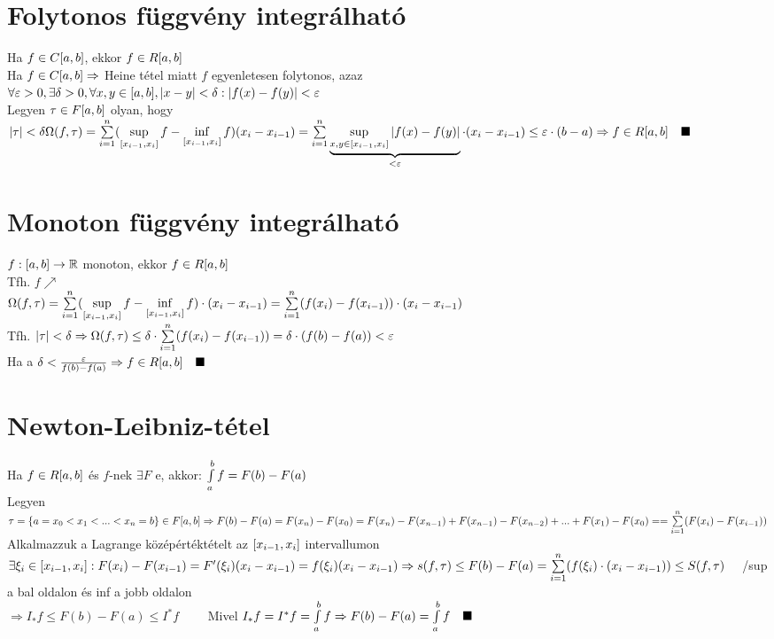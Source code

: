 \documentclass[a4paper,11pt]{article}
\begin{document}
\section{Folytonos függvény integrálható}
\tetel Ha $f\in C[a,b]$, ekkor $f\in R[a,b]$\\[0.2cm]
\biz Ha $f\in C[a,b]\Rightarrow$ Heine tétel miatt $f$ egyenletesen folytonos, azaz\\[0.2cm]
$\forall\varepsilon>0,\exists\delta>0,\forall x,y\in[a,b],\abs{x-y}<\delta:
\abs{f(x)-f(y)}<\varepsilon$\\[0.2cm]
Legyen $\tau\in F[a,b]$ olyan, hogy $\abs{\tau}<\delta\\[0.2cm]
\Omega(f,\tau)=\sum\limits_{i=1}^{n}(\sup\limits_{[x_{i-1},x_i]}f-\inf\limits_{[x_{i-1},x_i]}f)(x_i-x_{i-1})=\sum\limits_{i=1}^{n}
\underbrace{\sup\limits_{x,y\in[x_{i-1},x_i]}\abs{f(x)-f(y)}}_{<\varepsilon}\cdot(x_i-x_{i-1})
\leq\varepsilon\cdot(b-a)\\[0.2cm]\Rightarrow f\in R[a,b]\quad\blacksquare$
\section{Monoton függvény integrálható}
\tetel $f:[a,b]\to\mathbb{R}$ monoton, ekkor $f\in R[a,b]$\\[0.2cm]
\biz Tfh. $f\nearrow$\\[0.2cm]$\Omega(f,\tau)=\sum\limits_{i=1}^{n}
(\sup\limits_{[x_{i-1},x_i]}f-\inf\limits_{[x_{i-1},x_i]}f)\cdot(x_i-x_{i-1})=\sum\limits_{i=1}^{n}
(f(x_i)-f(x_{i-1}))\cdot(x_i-x_{i-1})$\\[0.2cm]Tfh. $\abs{\tau}<\delta\Rightarrow
\Omega(f,\tau)\leq\delta\cdot\sum\limits_{i=1}^{n}(f(x_i)-f(x_{i-1}))=\delta\cdot(f(b)-f(a))<\varepsilon$
\\[0.2cm]Ha a $\delta<\frac{\varepsilon}{f(b)-f(a)}\Rightarrow f\in R[a,b]\quad\blacksquare$
\newpage
\section{Newton-Leibniz-tétel}
\tetel Ha $f\in R[a,b]$ és $f$-nek $\exists F$ \prfv e, akkor: $\int\limits_{a}^{b} f=F(b)-F(a)$\\[0.1cm]
\biz Legyen $\tau=\{a=x_0<x_1<...<x_n=b\}\in F[a,b]\\[0.2cm]\Rightarrow F(b)-F(a)=
F(x_n)-F(x_0)=F(x_n)-F(x_{n-1})+F(x_{n-1})-F(x_{n-2})+...+F(x_1)-F(x_0)=\\[0.2cm]=
\sum\limits_{i=1}^{n}(F(x_i)-F(x_{i-1}))$ Alkalmazzuk a Lagrange középértéktételt az $[x_{i-1},x_i]$
intervallumon\\[0.2cm]$\exists\xi_i\in[x_{i-1},x_i]:F(x_i)-F(x_{i-1})=F'(\xi_i)
(x_i-x_{i-1})=f(\xi_i)(x_i-x_{i-1})\\[0.2cm]\Rightarrow
s(f,\tau)\leq F(b)-F(a)=\sum\limits_{i=1}^{n}(f(\xi_i)\cdot(x_i-x_{i-1}))\leq S(f,\tau)\quad$
/sup a bal oldalon és inf a jobb oldalon\\
$\Rightarrow I_*f\leq F(b)-F(a)\leq I^*f\quad\quad$
Mivel $I_*f=I^*f=\int\limits_{a}^{b} f\Rightarrow F(b)-F(a)=\int\limits_{a}^{b} f\quad\blacksquare$
\end{document}
